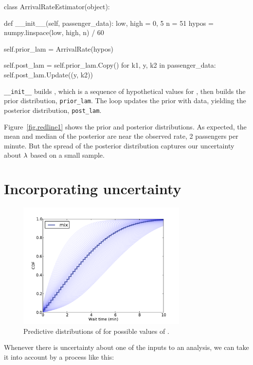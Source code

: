 \documentclass[12pt]{book}
\theoremstyle{exercise}
\begin{document}
\begin{code}
class ArrivalRateEstimator(object):

    def __init__(self, passenger_data):
        low, high = 0, 5
        n = 51
        hypos = numpy.linspace(low, high, n) / 60

        self.prior_lam = ArrivalRate(hypos)

        self.post_lam = self.prior_lam.Copy()
        for k1, y, k2 in passenger_data:
            self.post_lam.Update((y, k2))
\end{code}

\verb"__init__" builds
, which is a sequence of hypothetical values for ,
then builds the prior distribution, \verb"prior_lam".
The  loop updates the prior with data, yielding the posterior
distribution, \verb"post_lam".

Figure~\ref{fig.redline1} shows
the prior and posterior distributions.  As expected, the mean and
median of the posterior are near the observed rate, 2 passengers per
minute.  But the spread of the posterior distribution captures our
uncertainty about $\mathtt{\lambda}$ based on a small sample.


\section{Incorporating uncertainty}

\begin{figure}
\centerline{\includegraphics[height=2.5in]{figs/redline4.pdf}}
\caption{Predictive distributions of  for possible values
  of . }
\label{fig.redline4}
\end{figure}

Whenever there is uncertainty about one of the inputs to an analysis,
we can take it into account by a process like this:
\end{document}
